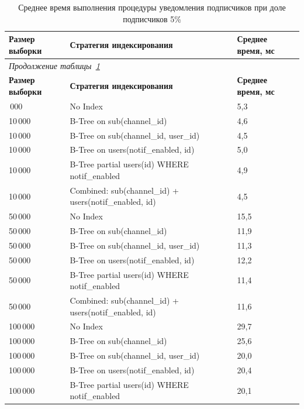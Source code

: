 \begin{longtable}{|p{2.4cm}|p{9.9cm}|p{2.3cm}|}
    \caption{Среднее время выполнения процедуры уведомления подписчиков при доле подписчиков 5\%}\label{tab:benchmark_avg_0_05} \\
    \hline
    \textbf{Размер выборки} & \textbf{Стратегия индексирования} & \textbf{Среднее время, мс} \\
    \hline
    \endfirsthead
    \multicolumn{3}{l}{\textit{Продолжение таблицы~\ref{tab:benchmark_avg_0_05}}} \\
    \hline
    \textbf{Размер выборки} & \textbf{Стратегия индексирования} & \textbf{Среднее время, мс} \\
    \hline
    \endhead
    \endfoot
    \endlastfoot
    10\,000 & No Index & 5,3 \\
    \hline
    10\,000 & B-Tree on sub(channel\_id) & 4,6 \\
    \hline
    10\,000 & B-Tree on sub(channel\_id, user\_id) & 4,5 \\
    \hline
    10\,000 & B-Tree on users(notif\_enabled, id) & 5,0 \\
    \hline
    10\,000 & B-Tree partial users(id) WHERE notif\_enabled & 4,9 \\
    \hline
    10\,000 & Combined: sub(channel\_id) + users(notif\_enabled, id) & 4,5 \\
    \hline
    50\,000 & No Index & 15,5 \\
    \hline
    50\,000 & B-Tree on sub(channel\_id) & 11,9 \\
    \hline
    50\,000 & B-Tree on sub(channel\_id, user\_id) & 11,3 \\
    \hline
    50\,000 & B-Tree on users(notif\_enabled, id) & 12,2 \\
    \hline
    50\,000 & B-Tree partial users(id) WHERE notif\_enabled & 11,4 \\
    \hline
    50\,000 & Combined: sub(channel\_id) + users(notif\_enabled, id) & 11,6 \\
    \hline
    100\,000 & No Index & 29,7 \\
    \hline
    100\,000 & B-Tree on sub(channel\_id) & 25,6 \\
    \hline
    100\,000 & B-Tree on sub(channel\_id, user\_id) & 20,0 \\
    \hline
    100\,000 & B-Tree on users(notif\_enabled, id) & 20,4 \\
    \hline
    100\,000 & B-Tree partial users(id) WHERE notif\_enabled & 20,1 \\
    \hline

\end{longtable}
